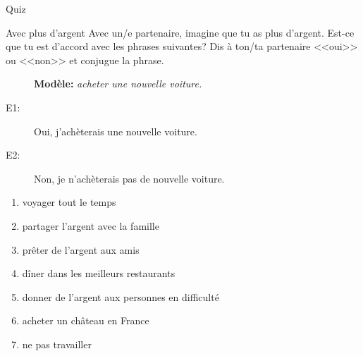 \documentclass{beamer}
\begin{document}
  \begin{frame}{}
    \begin{center}
      \Large Quiz
    \end{center}
  \end{frame}

  \begin{frame}{Avec plus d'argent}
    Avec un/e partenaire, imagine que tu as plus d'argent.
    Est-ce que tu est d'accord avec les phrases suivantes?
    Dis à ton/ta partenaire <<oui>> ou <<non>> et conjugue la phrase.
    \begin{description}
      \item[] \textbf{Modèle:} \emph{acheter une nouvelle voiture.}
      \item[E1:] Oui, j'achèterais une nouvelle voiture.
      \item[E2:] Non, je n'achèterais pas de nouvelle voiture.
    \end{description}
    \begin{enumerate}
      \item voyager tout le temps
      \item partager l'argent avec la famille
      \item prêter de l'argent aux amis
      \item dîner dans les meilleurs restaurants
      \item donner de l'argent aux personnes en difficulté
      \item acheter un château en France
      \item ne pas travailler
    \end{enumerate}
  \end{frame}
\end{document}

